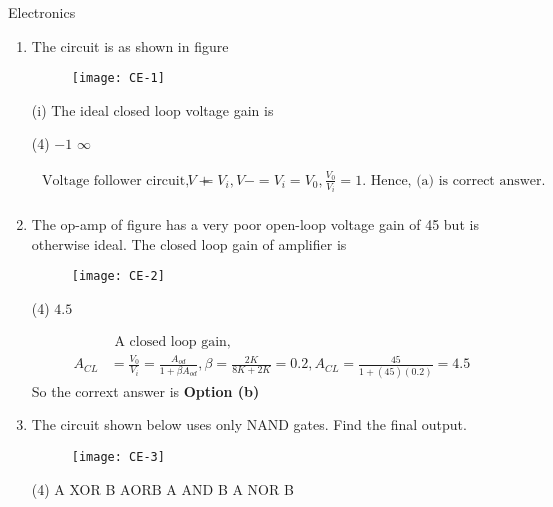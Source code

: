 \begin{abox}
	Electronics
	\end{abox}
\begin{enumerate}
	\item The circuit is as shown in figure
	\begin{figure}[H]
		\centering
		\texttt{[image: CE-1]}
	\end{figure}
	(i) The ideal closed loop voltage gain is
	 \begin{tasks}(4)
		\task[\textbf{b.}]$-1$
		\task[\textbf{c.}]$\infty$
	\end{tasks}
	\begin{answer}
		$$
		\begin{aligned}
		\text { Voltage follower circuit, } V+&=V_{i}, V-=V_{i}=V_{0}, \frac{V_{0}}{V_{i}}=1 \text {. Hence, (a) is correct answer. }\\
		\end{aligned}
	$$
	\end{answer}
	\item The op-amp of figure has a very poor open-loop voltage gain of 45 but is otherwise ideal. The closed loop gain of amplifier is
	\begin{figure}[H]
		\centering
		\texttt{[image: CE-2]}
	\end{figure}
	 \begin{tasks}(4)
		\task[\textbf{b.}]$4.5$
	\end{tasks}
	\begin{answer}
		$$
		\begin{aligned}
		&\text { A closed loop gain, }\\
		A_{C L}&=\frac{V_{0}}{V_{i}}=\frac{A_{o d}}{1+\beta A_{o d}}, \beta=\frac{2 K}{8 K+2 K}=0.2, A_{C L}=\frac{45}{1+(45)(0.2)}=4.5
	\end{aligned}
	$$
	So the corrext answer is \textbf{Option (b)}
	\end{answer}
	\item  The circuit shown below uses only NAND gates. Find the final output. 
	\begin{figure}[H]
		\centering
		\texttt{[image: CE-3]}
	\end{figure}
	 \begin{tasks}(4)
		\task[\textbf{a.}]A XOR B
		\task[\textbf{b.}]$\mathrm{AOR} \mathrm{B}$
		\task[\textbf{c.}]A AND B
		\task[\textbf{d.}] A NOR B

\end{tasks}
\end{enumerate}
